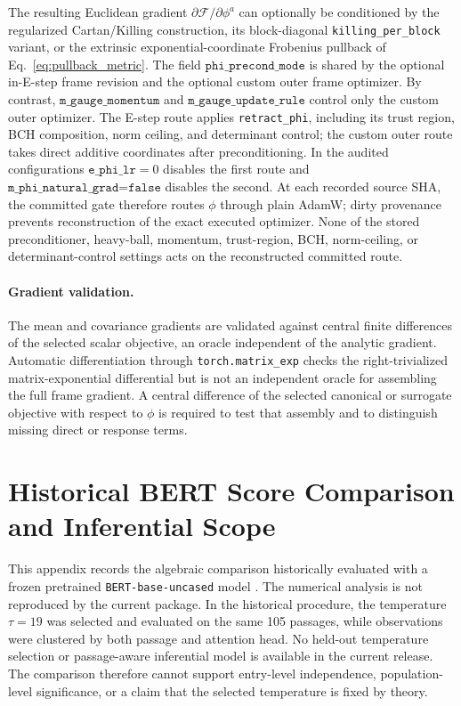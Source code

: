 \documentclass[twoside,11pt]{article}
\begin{document}
The resulting Euclidean gradient $\partial\mathcal{F}/\partial\phi^a$ can optionally be conditioned by the regularized Cartan/Killing construction, its block-diagonal \texttt{killing\_per\_block} variant, or the extrinsic exponential-coordinate Frobenius pullback of Eq.~\eqref{eq:pullback_metric}. The field $\texttt{phi\_precond\_mode}$ is shared by the optional in-E-step frame revision and the optional custom outer frame optimizer. By contrast, $\texttt{m\_gauge\_momentum}$ and $\texttt{m\_gauge\_update\_rule}$ control only the custom outer optimizer. The E-step route applies \texttt{retract\_phi}, including its trust region, BCH composition, norm ceiling, and determinant control; the custom outer route takes direct additive coordinates after preconditioning. In the audited configurations $\texttt{e\_phi\_lr}=0$ disables the first route and $\texttt{m\_phi\_natural\_grad=false}$ disables the second. At each recorded source SHA, the committed gate therefore routes $\phi$ through plain AdamW; dirty provenance prevents reconstruction of the exact executed optimizer. None of the stored preconditioner, heavy-ball, momentum, trust-region, BCH, norm-ceiling, or determinant-control settings acts on the reconstructed committed route.


\paragraph{Gradient validation.} The mean and covariance gradients are validated against central finite differences of the selected scalar objective, an oracle independent of the analytic gradient. Automatic differentiation through \texttt{torch.matrix\_exp} checks the right-trivialized matrix-exponential differential but is not an independent oracle for assembling the full frame gradient. A central difference of the selected canonical or surrogate objective with respect to $\phi$ is required to test that assembly and to distinguish missing direct or response terms.


\section{Historical BERT Score Comparison and Inferential Scope}
\label{app:bert_validation}

This appendix records the algebraic comparison historically evaluated with a frozen pretrained \texttt{BERT-base-uncased} model \citep{devlin2018bert}. The numerical analysis is not reproduced by the current package. In the historical procedure, the temperature $\tau=19$ was selected and evaluated on the same 105 passages, while observations were clustered by both passage and attention head. No held-out temperature selection or passage-aware inferential model is available in the current release. The comparison therefore cannot support entry-level independence, population-level significance, or a claim that the selected temperature is fixed by theory.
\end{document}
